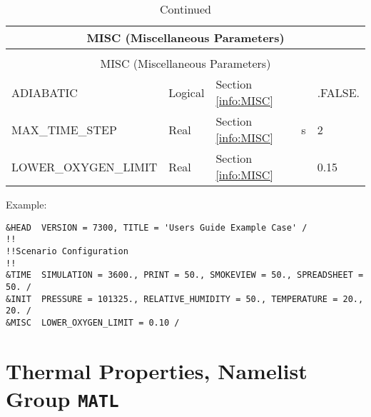 \begin{longtable}{@{\extracolsep{\fill}}|l|l|l|l|l|}
\caption[Miscellaneous Parameters ({\ct MISC} namelist group)]{For more information see Section~\ref{info:MISC}.}
\label{tbl:MISC} \\
\hline
\multicolumn{5}{|c|}{{\ct MISC} (Miscellaneous Parameters)} \\
\hline \hline
\endfirsthead
\caption[]{Continued} \\
\hline
\multicolumn{5}{|c|}{{\ct MISC} (Miscellaneous Parameters)} \\
\hline \hline
\endhead
{\ct ADIABATIC}            & Logical     & Section \ref{info:MISC}                 &           & {\ct .FALSE.}  \\ \hline
{\ct MAX\_TIME\_STEP}      & Real        & Section \ref{info:MISC}                 & s         &   2            \\ \hline
{\ct LOWER\_OXYGEN\_LIMIT} & Real        & Section \ref{info:MISC}                 &           &   0.15          \\ \hline
\end{longtable}

\noindent Example:
\begin{lstlisting}
&HEAD  VERSION = 7300, TITLE = 'Users Guide Example Case' /
!!
!!Scenario Configuration
!!
&TIME  SIMULATION = 3600., PRINT = 50., SMOKEVIEW = 50., SPREADSHEET = 50. /
&INIT  PRESSURE = 101325., RELATIVE_HUMIDITY = 50., TEMPERATURE = 20., 20. /
&MISC  LOWER_OXYGEN_LIMIT = 0.10 /
\end{lstlisting}




\clearpage
\section{Thermal Properties, Namelist Group \texorpdfstring{{\tt MATL}}{MATL}}


